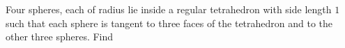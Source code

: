 Four spheres, each of radius  lie inside a regular tetrahedron with side length $1$ such that each sphere is tangent to three faces of the tetrahedron and to the other three spheres.  Find 